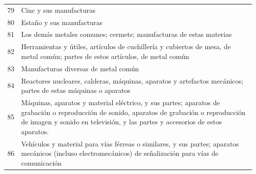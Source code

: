 \documentclass[a4paper,openright,12pt]{book}
\begin{document}
\begin{table}[]
{\begin{tabular}{@{}ll@{}}
    79  & Cinc y sus manufacturas                                                                                                                                                                                                                                                                        \\
    80  & Estaño y sus manufacturas                                                                                                                                                                                                                                                                      \\
    81  & Los demás metales comunes; cermets; manufacturas de estas materias                                                                                                                                                                                                                             \\
    82  & Herramientas y útiles, artículos de cuchillería y cubiertos de mesa, de metal común; partes de estos artículos, de metal común                                                                                                                                                                 \\
    83  & Manufacturas diversas de metal común                                                                                                                                                                                                                                                           \\
    84  & Reactores nucleares, calderas, máquinas, aparatos y artefactos mecánicos; partes de estas máquinas o aparatos                                                                                                                                                                                  \\
    85  & Máquinas, aparatos y material eléctrico, y sus partes; aparatos de grabación o reproducción de sonido, aparatos de grabación o reproducción de imagen y sonido en televisión, y las partes y accesorios de estos aparatos.                                                                     \\
    86  & Vehículos y material para vías férreas o similares, y sus partes; aparatos mecánicos (incluso electromecánicos) de señalización para vías de comunicación                                                                                                                                      \\

\end{tabular}}
\end{table}
\end{document}
